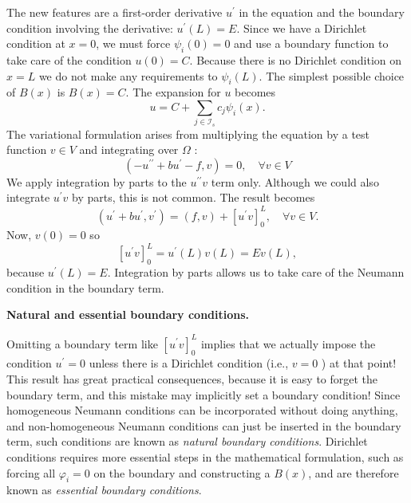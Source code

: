 \documentclass[../main.tex]{subfiles}
\begin{document}
		\noindent The new features are a first-order derivative $u^{\prime}$ in the equation and the boundary condition involving the derivative: $u^{\prime}(L)=E$. Since we have a Dirichlet condition at $x=0$, we must force $\psi_{i}(0)=0$ and use a boundary function to take care of the condition $u(0)=C$. Because there is no Dirichlet condition on $x=L$ we do not make any requirements to $\psi_{i}(L)$. The simplest possible choice of $B(x)$ is $B(x)=C$.\smallbreak
		The expansion for $u$ becomes
		$$
		u=C+\sum_{j \in \mathcal{I}_{s}} c_{j} \psi_{i}(x) .
		$$ \smallbreak
		The variational formulation arises from multiplying the equation by a test function $v \in V$ and integrating over $\Omega$ :
		$$
		\left(-u^{\prime \prime}+b u^{\prime}-f, v\right)=0, \quad \forall v \in V
		$$
		\noindent We apply integration by parts to the $u^{\prime \prime} v$ term only. Although we could also integrate $u^{\prime} v$ by parts, this is not common. The result becomes
		$$
		\left(u^{\prime}+b u^{\prime}, v^{\prime}\right)=(f, v)+\left[u^{\prime} v\right]_{0}^{L}, \quad \forall v \in V .
		$$
		Now, $v(0)=0$ so
		$$
		\left[u^{\prime} v\right]_{0}^{L}=u^{\prime}(L) v(L)=E v(L),
		$$
		because $u^{\prime}(L)=E$. Integration by parts allows us to take care of the Neumann condition in the boundary term.
		
		\begin{mybox}
			\textbf{Natural and essential boundary conditions.}
			
			\noindent Omitting a boundary term like $\left[u^{\prime} v\right]_{0}^{L}$ implies that we actually impose the condition $u^{\prime}=0$ unless there is a Dirichlet condition (i.e., $v=0$ ) at that point! This result has great practical consequences, because it is easy to forget the boundary term, and this mistake may implicitly set a boundary condition! Since homogeneous Neumann conditions can be incorporated without doing anything, and non-homogeneous Neumann conditions can just be inserted in the boundary term, such conditions are known as \emph{natural boundary conditions}. Dirichlet conditions requires more essential steps in the mathematical formulation, such as forcing all $\varphi_{i}=0$ on the boundary and constructing a $B(x)$, and are therefore known as \emph{essential boundary conditions}.
		\end{mybox}
	
\end{document}
